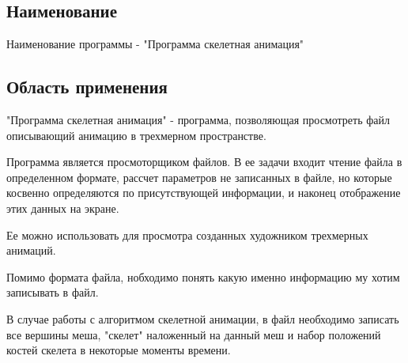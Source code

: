 \subsection{Наименование}
Наименование программы - "Программа скелетная анимация"

\subsection{Область применения}
"Программа скелетная анимация" - программа, позволяющая просмотреть файл описывающий анимацию в трехмерном пространстве. 

Программа является просмоторщиком файлов. В ее задачи входит чтение файла в определенном формате, рассчет параметров не записанных  в файле, но которые косвенно определяются по присутствующей информации, и наконец отображение этих данных на экране. 

Ее можно использовать для просмотра созданных художником трехмерных анимаций. 

Помимо формата файла, нобходимо понять какую именно информацию му хотим записывать в файл. 

В случае работы с алгоритмом скелетной анимации, в файл необходимо записать все вершины меша, "скелет" наложенный на данный меш и набор положений костей скелета в некоторые моменты времени.
